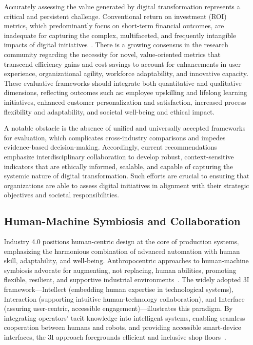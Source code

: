 \documentclass[sigconf]{acmart}
\begin{document}
Accurately assessing the value generated by digital transformation represents a critical and persistent challenge. Conventional return on investment (ROI) metrics, which predominantly focus on short-term financial outcomes, are inadequate for capturing the complex, multifaceted, and frequently intangible impacts of digital initiatives~\cite{ref94}. There is a growing consensus in the research community regarding the necessity for novel, value-oriented metrics that transcend efficiency gains and cost savings to account for enhancements in user experience, organizational agility, workforce adaptability, and innovative capacity. These evaluative frameworks should integrate both quantitative and qualitative dimensions, reflecting outcomes such as: employee upskilling and lifelong learning initiatives, enhanced customer personalization and satisfaction, increased process flexibility and adaptability, and societal well-being and ethical impact.

A notable obstacle is the absence of unified and universally accepted frameworks for evaluation, which complicates cross-industry comparisons and impedes evidence-based decision-making. Accordingly, current recommendations emphasize interdisciplinary collaboration to develop robust, context-sensitive indicators that are ethically informed, scalable, and capable of capturing the systemic nature of digital transformation. Such efforts are crucial to ensuring that organizations are able to assess digital initiatives in alignment with their strategic objectives and societal responsibilities.

\subsection{Human-Machine Symbiosis and Collaboration}

Industry 4.0 positions human-centric design at the core of production systems, emphasizing the harmonious combination of advanced automation with human skill, adaptability, and well-being. Anthropocentric approaches to human-machine symbiosis advocate for augmenting, not replacing, human abilities, promoting flexible, resilient, and supportive industrial environments~\cite{ref90}. The widely adopted 3I framework---Intellect (embedding human expertise in technological systems), Interaction (supporting intuitive human-technology collaboration), and Interface (assuring user-centric, accessible engagement)---illustrates this paradigm. By integrating operators’ tacit knowledge into intelligent systems, enabling seamless cooperation between humans and robots, and providing accessible smart-device interfaces, the 3I approach foregrounds efficient and inclusive shop floors~\cite{ref90,ref17}.
\end{document}
